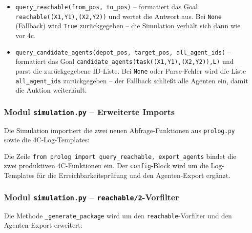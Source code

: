 \begin{itemize}
    \item \texttt{query\_reachable(from\_pos, to\_pos)} -- formatiert das Goal \\ \texttt{reachable((X1,Y1),(X2,Y2))} und wertet die Antwort aus. Bei \texttt{None} (Fallback) wird \texttt{True} zurückgegeben -- die Simulation verhält sich dann wie vor 4c.
    \item \texttt{query\_candidate\_agents(depot\_pos, target\_pos, all\_agent\_ids)} -- formatiert das Goal \texttt{candidate\_agents(task((X1,Y1),(X2,Y2)),L)} und parst die zurückgegebene ID-Liste. Bei \texttt{None} oder Parse-Fehler wird die Liste \texttt{all\_agent\_ids} zurückgegeben -- der Fallback schließt alle Agenten ein, damit die Auktion weiterläuft.
\end{itemize}


\subsubsection{Modul \texttt{simulation.py} – Erweiterte Imports}

Die Simulation importiert die zwei neuen Abfrage-Funktionen aus \texttt{prolog.py} sowie die 4C-Log-Templates:





Die Zeile \texttt{from prolog import query\_reachable, export\_agents} bindet die zwei produktiven 4C-Funktionen ein. Der \texttt{config}-Block wird um die Log-Templates für die Erreichbarkeitsprüfung und den Agenten-Export ergänzt.

\subsubsection{Modul \texttt{simulation.py} – \texttt{reachable/2}-Vorfilter}

Die Methode \texttt{\_generate\_package} wird um den \texttt{reachable}-Vorfilter und den Agenten-Export erweitert:

